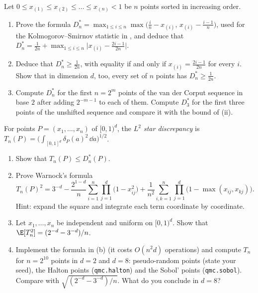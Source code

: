 
\begin{exercise}\label{ex:qmc-one-dim}
\easy Let $0\le x_{(1)}\le x_{(2)}\le\dots\le x_{(n)}<1$ be $n$ points sorted in increasing order.
\begin{enumerate}[label=(\alph*)]
  \item Prove the formula
    $D^*_n=\max_{1\le i\le n}\max\big(\frac in-x_{(i)},\,x_{(i)}-\frac{i-1}n\big)$, used for the
    Kolmogorov--Smirnov statistic in , and deduce that
    $D^*_n=\frac1{2n}+\max_{1\le i\le n}\big|x_{(i)}-\frac{2i-1}{2n}\big|$.
  \item Deduce that $D^*_n\ge\frac1{2n}$, with equality if and only if
    $x_{(i)}=\frac{2i-1}{2n}$ for every $i$. Show that in dimension $d$, too, every set of $n$
    points has $D^*_n\ge\frac1{2n}$.
  \item Compute $D^*_n$ for the first $n=2^m$ points of the van der Corput sequence in base $2$
    after adding $2^{-m-1}$ to each of them. Compute $D^*_3$ for the first three points of the
    unshifted sequence and compare it with the bound of (ii).
\end{enumerate}
\end{exercise}

\begin{exercise}\label{ex:qmc-warnock}
\medium For points $P=(x_1,\dots,x_n)$ of $[0,1)^d$, the \emph{$L^2$ star discrepancy} is
$T_n(P)=\big(\int_{[0,1]^d}\delta_P(a)^2\,\dd a\big)^{1/2}$.
\begin{enumerate}[label=(\alph*)]
  \item Show that $T_n(P)\le D^*_n(P)$.
  \item Prove Warnock's formula
    \[
      T_n(P)^2=3^{-d}-\frac{2^{1-d}}n\sum_{i=1}^n\prod_{j=1}^d\big(1-x_{ij}^2\big)
      +\frac1{n^2}\sum_{i,k=1}^n\prod_{j=1}^d\big(1-\max(x_{ij},x_{kj})\big).
    \]
    Hint: expand the square and integrate each term coordinate by coordinate.
  \item Let $x_1,\dots,x_n$ be independent and uniform on $[0,1)^d$. Show that
    $\E[T_n^2]=(2^{-d}-3^{-d})/n$.
  \item Implement the formula in (b) (it costs $O(n^2d)$ operations) and compute $T_n$ for
    $n=2^{10}$ points in $d=2$ and $d=8$: pseudo-random points (state your seed), the Halton
    points (\texttt{qmc.halton}) and the Sobol' points (\texttt{qmc.sobol}). Compare with
    $\sqrt{(2^{-d}-3^{-d})/n}$. What do you conclude in $d=8$?
\end{enumerate}
\end{exercise}


